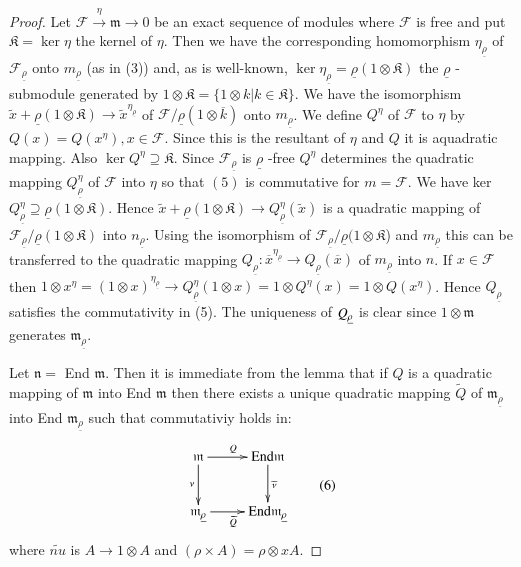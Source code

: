 \begin{proof}
Let $\mathscr{F}\xrightarrow{\eta} \mathfrak{m} \to 0$ be an exact
sequence of modules where $\mathscr{F}$ is free and put
$\mathfrak{K}= \ker \eta$ the kernel of $\eta$. Then we have the
corresponding homomorphism $\eta_{\underline{\rho}}$ of
$\mathscr{F}_{\underline{\rho}}$ onto $m_{\underline{\rho}}$ (as in
(3)) and, as is well-known, $\ker
\eta_{\underline{\rho}}=\underline{\rho}(1\otimes \mathfrak{K})$ the
${\underline{\rho}}$ -submodule generated by $1\otimes
\mathfrak{K}=\{1\otimes k| k\in \mathfrak{K}\}$. We have the
isomorphism $\widetilde{x}+{\underline{\rho}}(1\otimes
\mathfrak{K})\to \widetilde{x}^{\eta_{\underline{\rho}}}$ of
$\mathscr{F}/{\underline{\rho}}(1\otimes \overline{k})$ onto
$m_{\underline{\rho}}$. We define $Q^{\eta}$ of $\mathscr{F}$ to $\eta$
by $Q(x)=Q(x^{\eta}), x\in \mathscr{F}$. Since this is the resultant
of $\eta$ and $Q$ it is aquadratic mapping. Also $\ker
Q^{\eta}\supseteq \mathfrak{K}$. Since
$\mathscr{F}_{\underline{\rho}}$ is $\underline{\rho}$ -free
$Q^{\eta}$ determines the quadratic mapping
$Q^{\eta}_{\underline{\rho}}$ of $\mathscr{F}$ into $\eta$ so that $(5)$
is commutative for $m=\mathscr{F}$. We have ker
$Q^{\eta}_{\underline{\rho}}\supseteq \underline{\rho}(1\otimes
\mathfrak{K})$. Hence $\widetilde{x}+\underline{\rho}(1\otimes
\mathfrak{K})\to Q^{\eta}_{\underline{\rho}}(\widetilde{x})$ is a
quadratic mapping of
$\mathscr{F}_{\underline{\rho}}/\underline{\rho}(1\otimes
\mathfrak{K})$ into $n_{\underline{\rho}}$. Using the isomorphism of
$\mathscr{F}_{\underline{\rho}}/\underline{\rho}(1\otimes
\mathfrak{K}$) and $m_{\underline{\rho}}$ this can be transferred to
the quadratic mapping
$Q_{\underline{\rho}}:\overline{x}^{\eta_{\underline{\rho}}}\to
Q_{\underline{\rho}}(\overline{x})$ of $m_{\underline{\rho}}$ into
$n$. If $x\in \mathscr{F}$ then $1\otimes x^{\eta}=(1\otimes
x)^{\eta_{\underline{\rho}}}\to Q^{\eta}_{\underline{\rho}}(1\otimes
x)=1\otimes Q^{\eta}(x)=1\otimes Q(x^{\eta})$. Hence
$Q_{\underline{\rho}}$ satisfies the commutativity in\pageoriginale
(5). The uniqueness of $Q_{\underline{\rho}}$ is clear since $1\otimes
\mathfrak{m}$ generates $\mathfrak{m}_{\underline{\rho}}$.  

Let $\mathfrak{n}=$ End $\mathfrak{m}$. Then it is immediate from the
lemma that if $Q$ is a quadratic mapping of $\mathfrak{m}$ into End
$\mathfrak{m}$ then there exists a unique quadratic mapping
$\widetilde{Q}$ of $\mathfrak{m}_{\underline{\rho}}$ into End
$\mathfrak{m}_{\underline{\rho}}$ such that commutativiy holds in: 
\begin{equation*}
\vcenter{\xymatrix{
\mathfrak{m}\ar[d]_{\nu}\ar[r]^{Q}&
\text{End}\mathfrak{m}\ar[d]^{\widetilde{\nu}}\\ 
\mathfrak{m}_{\underline{\rho}}\ar[r]_{\widetilde{Q}}&
\text{End}\mathfrak{m}_{\underline{\rho}} }}\tag{6}\label{c1:eq6}
\end{equation*}
where $\tilde{nu}$ is $A\to 1\otimes A$ and $(\rho \times A)=\rho
\otimes x A$.


\end{proof}
